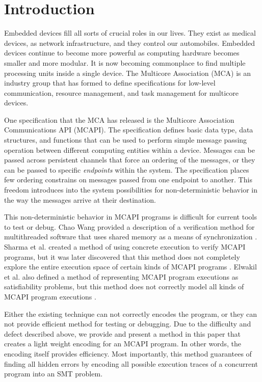 \section{Introduction}
Embedded devices fill all sorts of crucial roles in our lives. They exist as
medical devices, as network infrastructure, and they control our automobiles.
Embedded devices continue to become more powerful as computing hardware becomes
smaller and more modular. It is now becoming commonplace to find multiple
processing units inside a single device. The Multicore Association (MCA) is an
industry group that has formed to define specifications for low-level
communication, resource management, and task management for
multicore devices.

One specification that the MCA has released is the Multicore Association
Communications API (MCAPI). The specification defines basic data type, data
structures, and functions that can be used to perform simple message passing
operation between different computing entities within a device. Messages can be
passed across persistent channels that force an ordering of the messages, or
they can be passed to specific \emph{endpoints} within the system. The specification places few ordering constrains on messages passed from one
endpoint to another. This freedom introduces into the system possibilities for
non-deterministic behavior in the way the messages arrive at their destination. 

This non-deterministic behavior in MCAPI programs is difficult for current tools to test or debug. 
Chao Wang provided a description of a verification method for
multithreaded software that uses shared memory as a means of synchronization \cite{wang:fse09}.
Sharma et al. created a method of using concrete execution to verify MCAPI
programs, but it was later discovered that this method does not completely
explore the entire execution space of certain kinds of MCAPI programs \cite{sharma:fmcad09}. Elwakil
et al. also defined a method of representing MCAPI program executions as
satisfiability problems, but this method does not correctly model all kinds of
MCAPI program executions \cite{elwakil:padtad10}.

Either the existing technique can not correctly encodes the program, or they can not provide efficient method for testing or debugging.
Due to the difficulty and defect described above, we provide and present a method in this paper that creates a light weight encoding for an MCAPI program. In other words, the encoding itself provides efficiency. Most importantly, this method guarantees of finding all hidden errors by encoding all possible execution traces of a concurrent program into an SMT problem.

